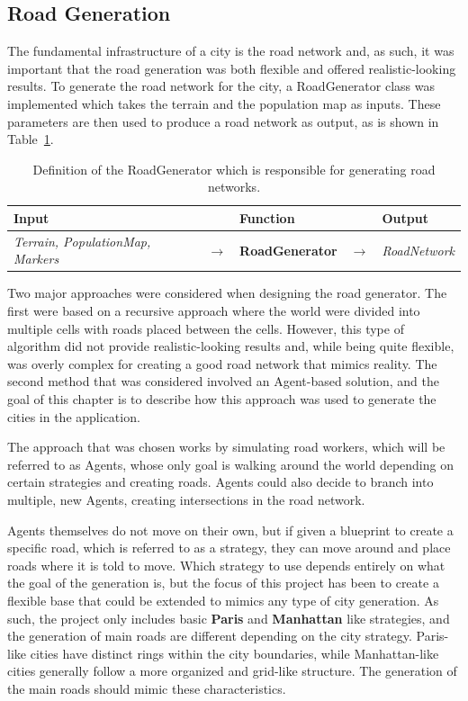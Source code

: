 \subsection{Road Generation}
The fundamental infrastructure of a city is the road network and, as such, it was important that the road generation was both flexible and offered realistic-looking results.
To generate the road network for the city, a RoadGenerator class was implemented which takes the terrain and the population map as inputs.
These parameters are then used to produce a road network as output, as is shown in Table~\ref{table:def_roadgen}.

\begin{table}[H]
  \centering
  \begin{tabular}{lllll}
    \textbf{Input} & & \textbf{Function} & & \textbf{Output} \\
    \midrule
    \textit{Terrain, PopulationMap, Markers} & $\rightarrow$ & \textbf{RoadGenerator} & $\rightarrow$ & \textit{RoadNetwork} \\
    \bottomrule
  \end{tabular}

  \caption{Definition of the RoadGenerator which is responsible for generating road networks.}
  \label{table:def_roadgen}
\end{table}
\vspace{-0.4cm}

Two major approaches were considered when designing the road generator.
The first were based on a recursive approach where the world were divided into multiple cells with roads placed between the cells.
However, this type of algorithm did not provide realistic-looking results and, while being quite flexible, was overly complex for creating a good road network that mimics reality.
The second method that was considered involved an Agent-based solution, and the goal of this chapter is to describe how this approach was used to generate the cities in the application.

The approach that was chosen works by simulating road workers, which will be referred to as Agents, whose only goal is walking around the world depending on certain strategies and creating roads.
Agents could also decide to branch into multiple, new Agents, creating intersections in the road network.

Agents themselves do not move on their own, but if given a blueprint to create a specific road, which is referred to as a strategy, they can move around and place roads where it is told to move.
Which strategy to use depends entirely on what the goal of the generation is, but the focus of this project has been to create a flexible base that could be extended to mimics any type of city generation.
As such, the project only includes basic \textbf{Paris} and \textbf{Manhattan} like strategies, and the generation of main roads are different depending on the city strategy.
Paris-like cities have distinct rings within the city boundaries, while Manhattan-like cities generally follow a more organized and grid-like structure.
The generation of the main roads should mimic these characteristics.

